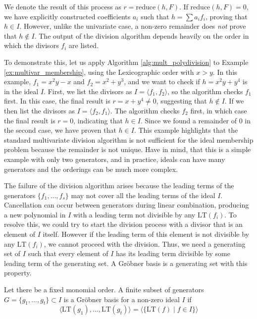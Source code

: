 We denote the result of this process as $r = \text{reduce}(h, F)$. If $\text{reduce}(h, F) = 0$, we have explicitly constructed coefficients $a_i$ such that $h = \sum a_i f_i$, proving that $h \in I$. However, unlike the univariate case, a non-zero remainder does \textit{not} prove that $h \notin I$. The output of the division algorithm depends heavily on the order in which the divisors $f_i$ are listed.

To demonstrate this, let us apply Algorithm \ref{alg:mult_polydivision} to Example \ref{ex:multivar_membership}, using the Lexicographic order with $x > y$. In this example, $f_1 = x^2 y - x$ and $f_2 = x^2 + y^3$, and we want to check if $h = x^2 y + y^4$ is in the ideal $I$. First, we list the divisors as $I = \langle f_1, f_2 \rangle$, so the algorithm checks $f_1$ first. In this case, the final result is $r = x + y^4 \neq 0$, suggesting that $h \notin I$. If we then list the divisors as $I = \langle f_2, f_1 \rangle$. The algorithm checks $f_2$ first, in which case the final result is $r = 0$, indicating that $h \in I$. Since we found a remainder of 0 in the second case, we have proven that $h \in I$. This example highlights that the standard multivariate division algorithm is not sufficient for the ideal membership problem because the remainder is not unique. Have in mind, that this is a simple example with only two generators, and in practice, ideals can have many generators and the orderings can be much more complex.

The failure of the division algorithm arises because the leading terms of the generators $\{f_1, \dots, f_s\}$ may not cover all the leading terms of the ideal $I$. Cancellation can occur between generators during linear combination, producing a new polynomial in $I$ with a leading term not divisible by any $\text{LT}(f_i)$. To resolve this, we could try to start the division process with a divisor that is an element of $I$ itself. However if the leading term of this element is not divisible by any $\text{LT}(f_i)$, we cannot proceed with the division. Thus, we need a generating set of $I$ such that every element of $I$ has its leading term divisible by some leading term of the generating set. A Gröbner basis is a generating set with this property.

\begin{definition}
\label{def:grobner_basis}
Let there be a fixed monomial order. A finite subset of generators $G = \{g_1, \dots, g_t\} \subset I$ is a Gröbner basis for a non-zero ideal $I$ if 
$$
\langle \text{LT}(g_1), \dots, \text{LT}(g_t) \rangle = \langle \{ \text{LT}(f) \mid f \in I \} \rangle
$$
\end{definition}

